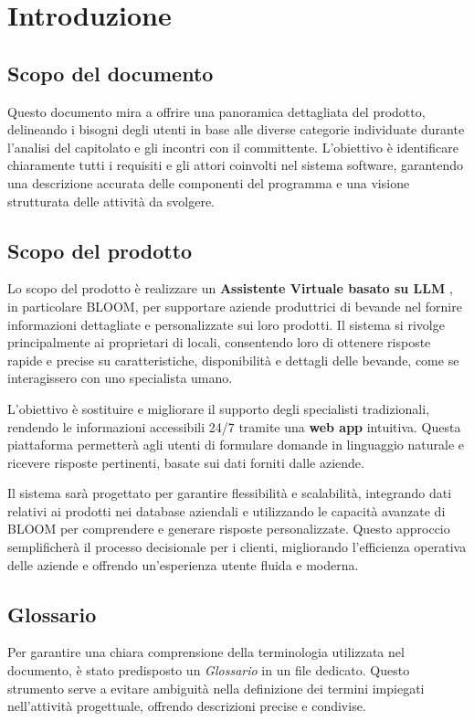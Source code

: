 \section{Introduzione}

\subsection{Scopo del documento}
Questo documento mira a offrire una panoramica dettagliata del prodotto, 
delineando i bisogni degli utenti in base alle diverse categorie individuate durante 
l'analisi del capitolato e gli incontri con il committente.
L'obiettivo è identificare chiaramente tutti i requisiti e gli attori coinvolti
nel sistema software, garantendo una descrizione accurata delle componenti del programma
e una visione strutturata delle attività da svolgere. 

\subsection{Scopo del prodotto}
Lo scopo del prodotto è realizzare un \textbf{Assistente Virtuale basato su LLM }, 
in particolare BLOOM, per supportare aziende produttrici di bevande nel fornire 
informazioni dettagliate e personalizzate sui loro prodotti. 
Il sistema si rivolge principalmente ai proprietari di locali, 
consentendo loro di ottenere risposte rapide e precise su caratteristiche, 
disponibilità e dettagli delle bevande, come se interagissero con uno specialista umano.

L’obiettivo è sostituire e migliorare il supporto degli specialisti tradizionali, 
rendendo le informazioni accessibili 24/7 tramite una \textbf{web app} intuitiva. 
Questa piattaforma permetterà agli utenti di formulare domande in linguaggio naturale 
e ricevere risposte pertinenti, basate sui dati forniti dalle aziende. 

Il sistema sarà progettato per garantire flessibilità e scalabilità, 
integrando dati relativi ai prodotti nei database aziendali e utilizzando 
le capacità avanzate di BLOOM per comprendere e generare risposte personalizzate. 
Questo approccio semplificherà il processo decisionale per i clienti, 
migliorando l’efficienza operativa delle aziende e offrendo 
un’esperienza utente fluida e moderna.

\subsection{Glossario}
Per garantire una chiara comprensione della terminologia utilizzata nel documento,
è stato predisposto un \emph{Glossario} in un file dedicato. Questo strumento 
serve a evitare ambiguità nella definizione dei termini impiegati nell’attività progettuale, 
offrendo descrizioni precise e condivise. 


